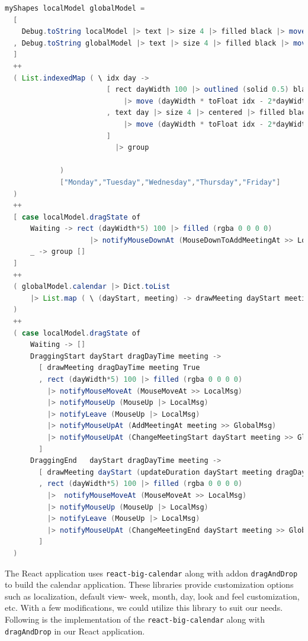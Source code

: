 \begin{lstlisting}[language=Java, caption=TEASync Calendar Shape, label=lst:java, mathescape=true]
    myShapes localModel globalModel =
  [
    Debug.toString localModel |> text |> size 4 |> filled black |> move (-90,60)
  , Debug.toString globalModel |> text |> size 4 |> filled black |> move (-90,56)
  ]
  ++
  ( List.indexedMap ( \ idx day -> 
                        [ rect dayWidth 100 |> outlined (solid 0.5) black
                            |> move (dayWidth * toFloat idx - 2*dayWidth, 0)
                        , text day |> size 4 |> centered |> filled black 
                            |> move (dayWidth * toFloat idx - 2*dayWidth, 45)
                        ]
                          |> group
                            
             )
             ["Monday","Tuesday","Wednesday","Thursday","Friday"]
  )
  ++
  [ case localModel.dragState of
      Waiting -> rect (dayWidth*5) 100 |> filled (rgba 0 0 0 0)
                    |> notifyMouseDownAt (MouseDownToAddMeetingAt >> LocalMsg)
      _ -> group []
  ]
  ++
  ( globalModel.calendar |> Dict.toList 
      |> List.map ( \ (dayStart, meeting) -> drawMeeting dayStart meeting False ) 
  )
  ++
  ( case localModel.dragState of
      Waiting -> []
      DraggingStart dayStart dragDayTime meeting -> 
        [ drawMeeting dragDayTime meeting True
        , rect (dayWidth*5) 100 |> filled (rgba 0 0 0 0)
          |> notifyMouseMoveAt (MouseMoveAt >> LocalMsg)
          |> notifyMouseUp (MouseUp |> LocalMsg)
          |> notifyLeave (MouseUp |> LocalMsg)
          |> notifyMouseUpAt (AddMeetingAt meeting >> GlobalMsg)
          |> notifyMouseUpAt (ChangeMeetingStart dayStart meeting >> GlobalMsg)
        ]
      DraggingEnd   dayStart dragDayTime meeting -> 
        [ drawMeeting dayStart (updateDuration dayStart meeting dragDayTime) True
        , rect (dayWidth*5) 100 |> filled (rgba 0 0 0 0)
          |>  notifyMouseMoveAt (MouseMoveAt >> LocalMsg)
          |> notifyMouseUp (MouseUp |> LocalMsg)
          |> notifyLeave (MouseUp |> LocalMsg)
          |> notifyMouseUpAt (ChangeMeetingEnd dayStart meeting >> GlobalMsg)
        ]
  )
\end{lstlisting}


The React application uses \lstinline{react-big-calendar}\cite{bigcalendar} along with addon \lstinline{dragAndDrop} to build the calendar application. These libraries provide customization options such as localization, default view- week, month, day, look and feel customization, etc. With a few modifications, we could utilize this library to suit our needs. Following is the implementation of the \lstinline{react-big-calendar} along with \lstinline{dragAndDrop} in our React application.


